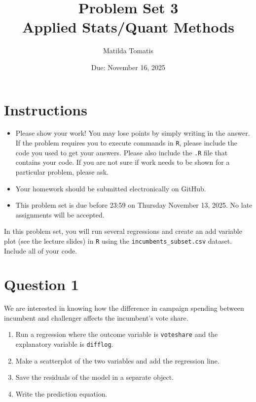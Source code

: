 \documentclass[12pt,letterpaper]{article}
\title{Problem Set 3 \\
	\large Applied Stats/Quant Methods }
\date{Due: November 16, 2025}
\author{Matilda Tomatis}
\begin{document}
	\maketitle
	\section*{Instructions}
	\begin{itemize}
		\item Please show your work! You may lose points by simply writing in the answer. If the problem requires you to execute commands in \texttt{R}, please include the code you used to get your answers. Please also include the \texttt{.R} file that contains your code. If you are not sure if work needs to be shown for a particular problem, please ask.
	\item Your homework should be submitted electronically on GitHub.
	\item This problem set is due before 23:59 on Thursday November 13, 2025. No late assignments will be accepted.

	\end{itemize}

		\vspace{.25cm}
	
\noindent In this problem set, you will run several regressions and create an add variable plot (see the lecture slides) in \texttt{R} using the \texttt{incumbents\_subset.csv} dataset. Include all of your code.

	\vspace{.5cm}
\section*{Question 1}
\vspace{.25cm}
\noindent We are interested in knowing how the difference in campaign spending between incumbent and challenger affects the incumbent's vote share. 
	\begin{enumerate}
		\item Run a regression where the outcome variable is \texttt{voteshare} and the explanatory variable is \texttt{difflog}.	
		\vspace{0.50cm}
		\item Make a scatterplot of the two variables and add the regression line. 	
		\vspace{0.50cm}
		\item Save the residuals of the model in a separate object.	
		\vspace{0.50cm}
		\item Write the prediction equation.
	\end{enumerate}
	
\end{document}
